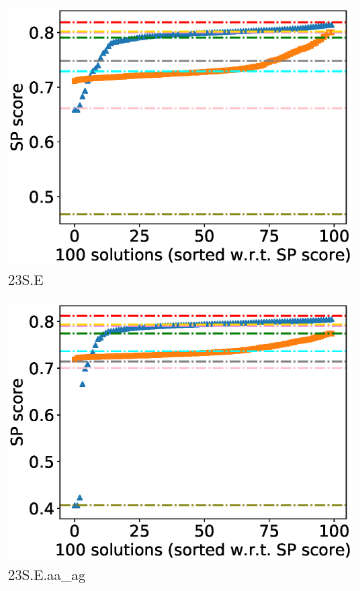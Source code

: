 \begin{figure}[!htbp]
\begin{adjustwidth}{-0.5cm}{-0.5cm}
\begin{subfigure}{0.25\textwidth}
			\includegraphics[width=\columnwidth]{Figure/summary/precomputedInit/23S.E/pairs_density_single_run}
			\caption{23S.E}
		\end{subfigure}    
		\begin{subfigure}{0.25\textwidth}
			\includegraphics[width=\columnwidth]{Figure/summary/precomputedInit/23S.E.aa_ag/pairs_density_single_run}
			\caption{23S.E.aa\_ag}
		\end{subfigure}
		\begin{subfigure}{0.25\textwidth}

\end{subfigure}
\end{adjustwidth}
\end{figure}
